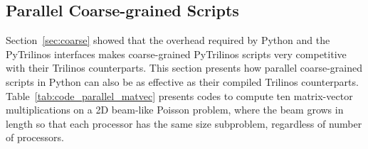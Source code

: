 \documentclass[acmtocl]{acmtrans2m}
\begin{document}
\subsection{Parallel Coarse-grained Scripts}
\label{sec:parallel}

Section~\ref{sec:coarse} showed that the overhead required by Python
and the PyTrilinos interfaces makes coarse-grained PyTrilinos
scripts very competitive with their Trilinos counterparts. This
section presents how parallel coarse-grained scripts in Python can
also be as effective as their compiled Trilinos counterparts.
Table~\ref{tab:code_parallel_matvec} presents codes to compute ten
matrix-vector multiplications on a 2D beam-like Poisson problem,
where the beam grows in length so that each processor has the same
size subproblem, regardless of number of processors.
\end{document}
